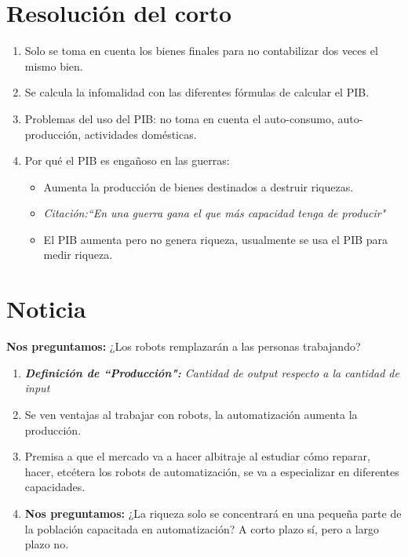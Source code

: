 \section{Resolución del corto}
\begin{enumerate}
    \item Solo se toma en cuenta los bienes finales para no contabilizar dos veces el mismo bien.
    \item Se calcula la infomalidad con las diferentes fórmulas de calcular el PIB.
    \item Problemas del uso del PIB: no toma en cuenta el auto-consumo, auto-producción, actividades domésticas.
    \item Por qué el PIB es engañoso en las guerras:
    \begin{itemize}
        \item Aumenta la producción de bienes destinados a destruir riquezas.
        \item \emph{Citación:``En una guerra gana el que más capacidad tenga de producir"}
        \item El PIB aumenta pero no genera riqueza, usualmente se usa el PIB para medir riqueza.
    \end{itemize}
\end{enumerate}

\section{Noticia}
\textbf{Nos preguntamos:} ¿Los robots remplazarán a las personas trabajando?
\begin{enumerate}
\item \emph{\textbf{Definición de ``Producción":} Cantidad de output respecto a la cantidad de input}
\item Se ven ventajas al trabajar con robots, la automatización aumenta la producción.
\item Premisa a que el mercado va a hacer albitraje al estudiar cómo reparar, hacer, etcétera los robots de automatización, se va a especializar en diferentes capacidades.
\item \textbf{Nos preguntamos:} ¿La riqueza solo se concentrará en una pequeña parte de la población capacitada en automatización? A corto plazo sí, pero a largo plazo no.
\end{enumerate}

